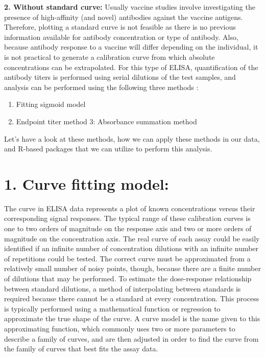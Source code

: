 \documentclass[
]{book}
\providecommand{\tightlist}{%
  \setlength{\itemsep}{0pt}\setlength{\parskip}{0pt}}
\begin{document}
\textbf{2. Without standard curve:} Usually vaccine studies involve investigating the presence of high-affinity (and novel) antibodies against the vaccine antigens.
Therefore, plotting a standard curve is not feasible as there is no previous information available for antibody concentration or type of antibody. Also, because antibody response to a vaccine will differ depending on the individual,
it is not practical to generate a calibration curve from which absolute concentrations can be extrapolated.
For this type of ELISA, quantification of the antibody titers is performed using serial dilutions of the test samples, and analysis can be performed using the following three methods \citep{hartman2018absorbance}:

\begin{enumerate}
\def\labelenumi{\arabic{enumi}.}
\tightlist
\item
  Fitting sigmoid model
\item
  Endpoint titer method
  3: Absorbance summation method
\end{enumerate}

Let's have a look at these methods, how we can apply these methods in our data, and R-based packages that we can utilize to perform this analysis.

\section{\texorpdfstring{\textbf{1. Curve fitting model:}}{1. Curve fitting model:}}\label{curve-fitting-model}

The curve in ELISA data represents a plot of known concentrations versus their corresponding signal responses. The typical range of these calibration curves is one to two orders of magnitude on the response axis and two or more orders of magnitude on the concentration axis. The real curve of each assay could be easily identified if an infinite number of concentration dilutions with an infinite number of repetitions could be tested. The correct curve must be approximated from a relatively small number of noisy points, though, because there are a finite number of dilutions that may be performed. To estimate the dose-response relationship between standard dilutions, a method of interpolating between standards is required because there cannot be a standard at every concentration. This process is typically performed using a mathematical function or regression to approximate the true shape of the curve. A curve model is the name given to this approximating function, which commonly uses two or more parameters to describe a family of curves, and are then adjusted in order to find the curve from the family of curves that best fits the assay data.
\end{document}
